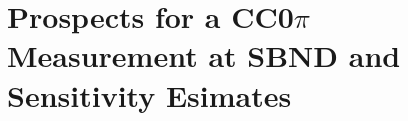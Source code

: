 \documentclass[11pt]{article}
\begin{document}


\section{Prospects for a CC0\( \pi \) Measurement at SBND and Sensitivity Esimates}
\label{sec:Prospects}



%

%

\newpage





\end{document}
